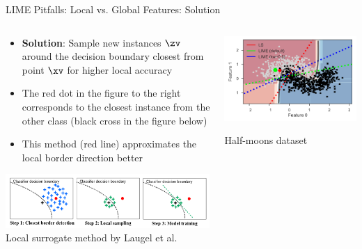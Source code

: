 \documentclass[11pt,compress,t,notes=noshow, aspectratio=169, xcolor=table]{beamer}
\begin{document}
\begin{vbframe}{LIME Pitfalls: Local vs. Global Features: Solution }
\begin{columns}
	\begin{column}{0.6\textwidth}
	\vspace{-.5cm}
		\begin{itemize}
		\item \textbf{Solution}: Sample new instances $\zv$ around the decision boundary closest from point $\xv$ for higher local accuracy
		\item The red dot in the figure to the right corresponds to the closest instance from the other class (black cross in the figure below)
		\item This method (red line) approximates the local border direction better 
	\end{itemize}
	\begin{center}
		\includegraphics[width=1\textwidth]{figure/laugel_method}
	    {Local surrogate method by Laugel et al.}
		\vspace{-0.3cm}
		\end{center}
\end{column}
\begin{column}{0.39\textwidth}
\vspace{0.3cm}

	\begin{center}
	\includegraphics[width=1\textwidth]{figure/lime-globallocal2}
	
	{Half-moons dataset}
	
\end{center}

	\end{column}

\end{columns}
\end{vbframe}
\end{document}
